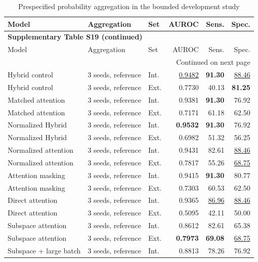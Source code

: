\clearpage
\begingroup\small\sffamily
\begin{longtable}{@{}p{}p{}lrrr@{}}
\caption{Prespecified probability aggregation in the bounded development study}\label{tab:S19}\\
\toprule
Model & Aggregation & Set & AUROC & Sens. & Spec. \\
\midrule
\endfirsthead
\multicolumn{6}{l}{\textbf{Supplementary Table S19 (continued)}}\\
\toprule
Model & Aggregation & Set & AUROC & Sens. & Spec. \\
\midrule
\endhead
\midrule\multicolumn{6}{r}{Continued on next page}\\
\endfoot
\bottomrule
\endlastfoot
Hybrid control & 3 seeds, reference & Int. & \underline{0.9482} & \textbf{91.30} & \underline{88.46} \\
Hybrid control & 3 seeds, reference & Ext. & 0.7730 & 40.13 & \textbf{81.25} \\
Matched attention & 3 seeds, reference & Int. & 0.9381 & \textbf{91.30} & 76.92 \\
Matched attention & 3 seeds, reference & Ext. & 0.7171 & 61.18 & 62.50 \\
Normalized Hybrid & 3 seeds, reference & Int. & \textbf{0.9532} & \textbf{91.30} & 76.92 \\
Normalized Hybrid & 3 seeds, reference & Ext. & 0.6982 & 51.32 & 56.25 \\
Normalized attention & 3 seeds, reference & Int. & 0.9431 & 82.61 & \underline{88.46} \\
Normalized attention & 3 seeds, reference & Ext. & 0.7817 & 55.26 & \underline{68.75} \\
Attention masking & 3 seeds, reference & Int. & 0.9415 & \textbf{91.30} & 80.77 \\
Attention masking & 3 seeds, reference & Ext. & 0.7303 & 60.53 & 62.50 \\
Direct attention & 3 seeds, reference & Int. & 0.9365 & \underline{86.96} & \underline{88.46} \\
Direct attention & 3 seeds, reference & Ext. & 0.5095 & 42.11 & 50.00 \\
Subspace attention & 3 seeds, reference & Int. & 0.8612 & 82.61 & 65.38 \\
Subspace attention & 3 seeds, reference & Ext. & \textbf{0.7973} & \textbf{69.08} & \underline{68.75} \\
Subspace + large batch & 3 seeds, reference & Int. & 0.8813 & 78.26 & 76.92 \\

\end{longtable}
